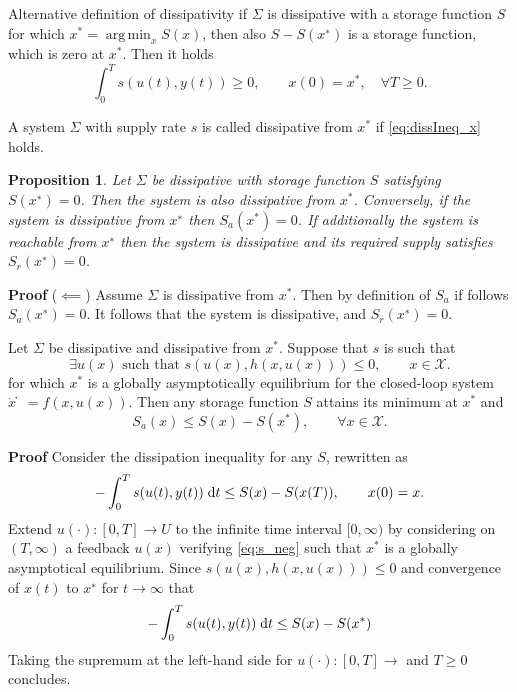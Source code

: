 \documentclass[aspectratio=169]{beamer}
\DeclareMathOperator*{\argmin}{arg\,min}
\newtheorem{proposition}{Proposition}
\begin{document}
\begin{frame}{Alternative definition of dissipativity}
if $\Sigma$ is dissipative with a storage function $S$ for which $x^* = \argmin_x S(x)$, then also $S -S(x^∗)$ is a storage function, which is zero at $x^*$. Then it holds
\begin{equation}\label{eq:dissIneq_x}
\int_{0}^{T} s(u(t), y(t)) \ge 0, \qquad x(0) = x^*, \quad \forall T \ge 0. 
\end{equation}
\begin{definition}
	A system $\Sigma$ with supply rate $s$ is called dissipative from $x^*$ if \eqref{eq:dissIneq_x} holds.
\end{definition}

\begin{proposition}
	Let $\Sigma$ be dissipative with storage function $S$ satisfying $S(x^∗)=0$. Then the system is also dissipative from $x^*$. Conversely, if the system is dissipative
	from $x^∗$ then $S_a (x^*) = 0$. If additionally the system is reachable from $x^∗$ then the
	system is dissipative and its required supply satisfies $S_r(x^∗) = 0$.
\end{proposition}
\textbf{Proof} ($\impliedby$) Assume $\Sigma$ is dissipative from $x^*$. Then by definition of $S_a$ if follows  $S_a(x^∗) = 0$. It follows that the system is dissipative, and $S_r(x^∗) = 0$.

\end{frame}

\begin{frame}
	\begin{theorem}
		Let $\Sigma$ be dissipative and dissipative from $x^*$. Suppose that $s$ is such that 
		\begin{equation}\label{eq:s_neg}
		\exists u(x) \text{ such that }	s(u(x), h(x,u(x))) \le 0, \qquad x \in \mathcal{X}.
		\end{equation}
		for which $x^*$ is a globally asymptotically equilibrium for the closed-loop system $\dot{x}̇ = f (x, u(x))$. Then any storage function $S$ attains its minimum at $x^*$ and 
		\begin{equation*}
			S_a(x) \le S(x) - S(x^*), \qquad \forall x \in \mathcal{X}.
		\end{equation*}
	\end{theorem}

\textbf{Proof} Consider the dissipation inequality for any $S$, rewritten as
\begin{equation*}
	-\int_0^T s(u(t), y(t)) \d t\le S(x) - S(x(T)), \qquad x(0) = x.
\end{equation*}
Extend $u(\cdot) : [0, T] \rightarrow U$ to the infinite time interval $[0, \infty)$ by
considering on $(T, \infty)$ a feedback $u(x)$ verifying \eqref{eq:s_neg} such that $x^*$ is a globally asymptotical equilibrium. Since $s(u(x), h(x,u(x))) \le 0$ and convergence of $x(t)$ to $x^∗$ for $t \rightarrow \infty$ that
\begin{equation*}
	-\int_0^T s(u(t), y(t)) \d t\le S(x) - S(x^*)
\end{equation*}
Taking the supremum at the left-hand side for $u(\cdot) : [0, T] \rightarrow$ and $T\ge 0$ concludes.
	
\end{frame}
\end{document}
